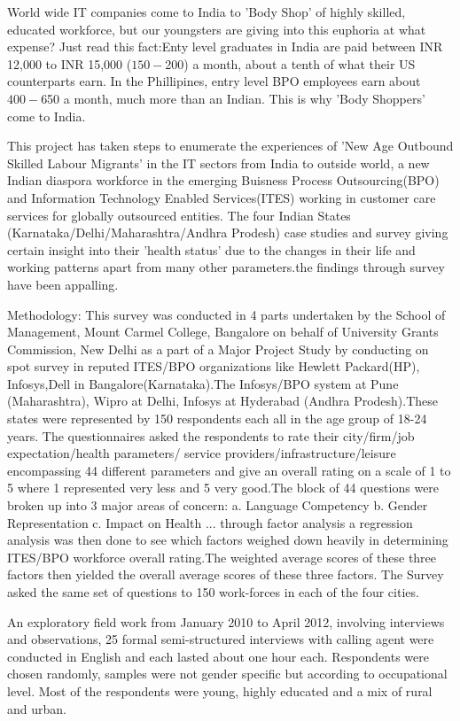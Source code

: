 World wide IT companies come to India to 'Body Shop' of highly skilled, educated workforce, but our youngsters are giving into this euphoria at what expense? Just read this fact:Enty level graduates in India are paid between INR 12,000 to INR 15,000 ($150-$200) a month, about a tenth of what their US counterparts earn. In the Phillipines, entry level BPO employees earn about $400- $650 a month, much more than an Indian. This is why 'Body Shoppers' come to India.



This project has taken steps to enumerate the experiences of 'New Age Outbound Skilled Labour Migrants' in the IT sectors from India to outside world, a new Indian diaspora  workforce in the emerging Buisness Process Outsourcing(BPO) and Information Technology Enabled Services(ITES) working in customer care services for globally outsourced entities. The four Indian States (Karnataka/Delhi/Maharashtra/Andhra Prodesh) case studies and survey giving certain insight into their 'health status' due to the changes in their life and working patterns apart from many other parameters.the findings through survey have been appalling.

Methodology:
This survey was conducted in 4 parts undertaken by the School of Management, Mount Carmel College, Bangalore on behalf of University Grants Commission, New Delhi as a part of a Major  Project Study by conducting on spot survey in reputed ITES/BPO organizations like Hewlett Packard(HP), Infosys,Dell in Bangalore(Karnataka).The Infosys/BPO system at Pune (Maharashtra), Wipro at Delhi, Infosys at Hyderabad (Andhra Prodesh).These states were represented by 150 respondents each all in the age group of 18-24 years. The questionnaires asked the respondents to rate their city/firm/job expectation/health parameters/ service providers/infrastructure/leisure encompassing 44 different parameters and give an overall rating on a scale of 1 to 5 where 1 represented very less and 5 very good.The block of 44 questions were broken up into 3 major areas of concern:
a. Language Competency
b. Gender Representation
c. Impact on Health
... through factor analysis a regression analysis was then done to see which factors weighed down heavily in determining ITES/BPO workforce overall rating.The weighted average scores of these three factors then yielded the overall average scores of these three factors. The Survey asked the same set of questions to 150 work-forces in each of the four cities.

An exploratory field work  from January 2010 to April 2012, involving interviews and observations, 25 formal semi-structured interviews with calling agent were conducted in English and each lasted about one hour each. Respondents were chosen randomly, samples were not gender specific but according to occupational level. Most of the respondents were young, highly educated and a mix of rural and urban.

